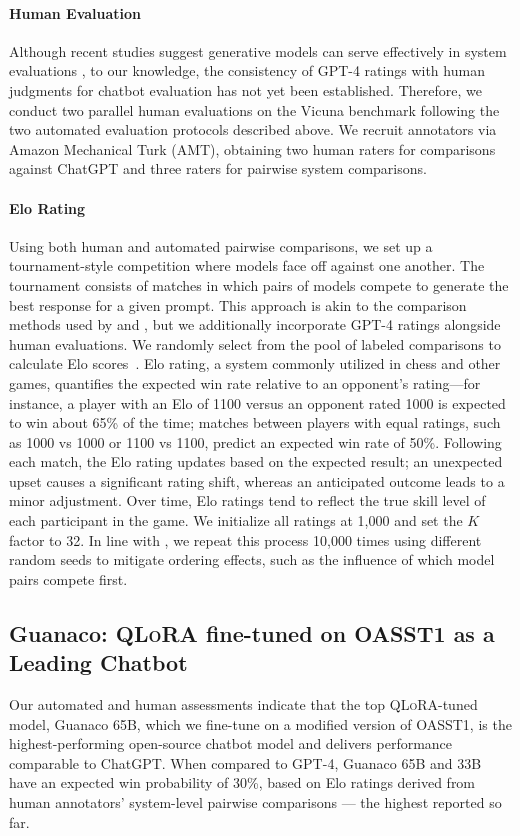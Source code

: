 \paragraph{Human Evaluation} Although recent studies suggest generative models can serve effectively in system evaluations \citep{fu2023gptscore}, to our knowledge, the consistency of GPT-4 ratings with human judgments for chatbot evaluation has not yet been established. Therefore, we conduct two parallel human evaluations on the Vicuna benchmark following the two automated evaluation protocols described above. We recruit annotators via Amazon Mechanical Turk (AMT), obtaining two human raters for comparisons against ChatGPT and three raters for pairwise system comparisons.

\paragraph{Elo Rating} Using both human and automated pairwise comparisons, we set up a tournament-style competition where models face off against one another. The tournament consists of matches in which pairs of models compete to generate the best response for a given prompt. This approach is akin to the comparison methods used by \citet{bai2022training} and \citet{vicuna2023}, but we additionally incorporate GPT-4 ratings alongside human evaluations. We randomly select from the pool of labeled comparisons to calculate Elo scores~\citep{elo1967proposed,elo1978rating}. Elo rating, a system commonly utilized in chess and other games, quantifies the expected win rate relative to an opponent's rating—for instance, a player with an Elo of 1100 versus an opponent rated 1000 is expected to win about 65\% of the time; matches between players with equal ratings, such as 1000 vs 1000 or 1100 vs 1100, predict an expected win rate of 50\%. Following each match, the Elo rating updates based on the expected result; an unexpected upset causes a significant rating shift, whereas an anticipated outcome leads to a minor adjustment. Over time, Elo ratings tend to reflect the true skill level of each participant in the game. We initialize all ratings at 1,000 and set the $K$ factor to 32. In line with \citet{vicuna2023}, we repeat this process 10,000 times using different random seeds to mitigate ordering effects, such as the influence of which model pairs compete first.

\subsection{\textbf{Guanaco}: \textsc{QLoRA} fine-tuned on OASST1 as a Leading Chatbot} Our automated and human assessments indicate that the top \textsc{QLoRA}-tuned model, {Guanaco} 65B, which we fine-tune on a modified version of OASST1, is the highest-performing open-source chatbot model and delivers performance comparable to ChatGPT. When compared to GPT-4, {Guanaco} 65B and 33B have an expected win probability of 30\%, based on Elo ratings derived from human annotators’ system-level pairwise comparisons — the highest reported so far.

